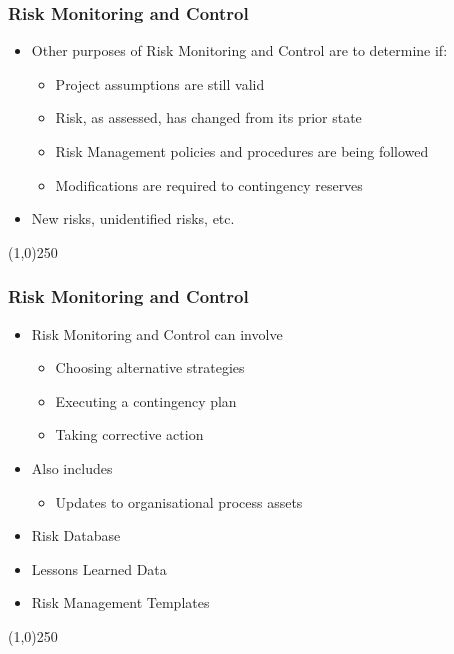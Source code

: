 \begin{frame}
\frametitle{Risk Monitoring and Control}
\begin{itemize}
\item Other purposes of Risk Monitoring and Control are to determine if:
\begin{itemize}
	\item Project assumptions are still valid
\item Risk, as assessed, has changed from its prior state
\item Risk Management policies and procedures are being followed
\item Modifications are required to contingency reserves
\end{itemize}
\item New risks, unidentified risks, etc.
\end{itemize}
\end{frame}\begin{center}\line(1,0){250}\end{center}


\begin{frame}
\frametitle{Risk Monitoring and Control}
\begin{itemize}
\item Risk Monitoring and Control can involve
\begin{itemize}
	\item Choosing alternative strategies
\item Executing a contingency plan
\item Taking corrective action
\end{itemize}

\item Also includes
\begin{itemize}
	\item Updates to organisational process assets
\end{itemize}
\item Risk Database
\item Lessons Learned Data
\item Risk Management Templates
\end{itemize}
\end{frame}\begin{center}\line(1,0){250}\end{center}


